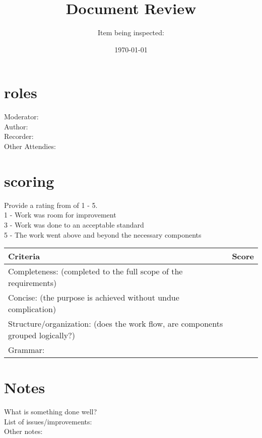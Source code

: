 \documentclass{article}
\title{Document Review}
\author{Item being inspected: }
\date{\today}
\begin{document}
\maketitle

\section{roles}
Moderator:\\
Author:\\
Recorder:\\
Other Attendies:\\

\section{scoring}
    Provide a rating from of 1 - 5. \\
    1 - Work was room for improvement\\
    3 - Work was done to an acceptable standard\\
    5 - The work went above and beyond the necessary components\\

\begin{tabular}{|l|c|}
	\hline
	Criteria & Score\\
	\hline
    Completeness:
    (completed to the full scope of the requirements) & \\
	\hline
    Concise:
    (the purpose is achieved without undue complication) & \\
	\hline
    Structure/organization:
    (does the work flow, are components grouped logically?) & \\
    \hline
    Grammar: & \\
    \hline
\end{tabular}

\section{Notes}
    
    What is something done well?\\
    
    List of issues/improvements:\\
    
    Other notes:\\
\end{document}
